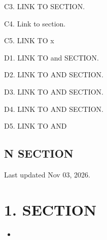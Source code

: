 \documentclass[letterpaper,10pt,english]{sphinxmanual}
\begin{document}
\sphinxAtStartPar
C\sphinxhyphen{}3. LINK TO {\hyperref[\detokenize{refs:translation-tips}]{}}\label{\detokenize{refs:x-tips}} SECTION.

\sphinxAtStartPar
C\sphinxhyphen{}4. Link to {\hyperref[\detokenize{refs:translation-tips}]{}} section.

\sphinxAtStartPar
C\sphinxhyphen{}5. LINK TO {\hyperref[\detokenize{refs:translation-tips}]{}}\label{\detokenize{refs:trans}} x {\hyperref[\detokenize{refs:translation-tips}]{}}\label{\detokenize{refs:lation}}

\sphinxAtStartPar
D\sphinxhyphen{}1. LINK TO {\hyperref[\detokenize{refs:translation-tips}]{}} and {\hyperref[\detokenize{refs:next-section}]{}} SECTION.

\sphinxAtStartPar
D\sphinxhyphen{}2. LINK TO {\hyperref[\detokenize{refs:translation-tips}]{}} AND {\hyperref[\detokenize{refs:next-section}]{}} SECTION.

\sphinxAtStartPar
D\sphinxhyphen{}3. LINK TO {\hyperref[\detokenize{refs:next-section}]{}} AND {\hyperref[\detokenize{refs:translation-tips}]{}} SECTION.

\sphinxAtStartPar
D\sphinxhyphen{}4. LINK TO {\hyperref[\detokenize{refs:next-section}]{}}\label{\detokenize{refs:n-section}} AND {\hyperref[\detokenize{refs:translation-tips}]{}}\label{\detokenize{refs:x-tips}} SECTION.

\sphinxAtStartPar
D\sphinxhyphen{}5. LINK TO {\hyperref[\detokenize{refs:next-section}]{}}\label{\detokenize{refs:next}} AND {\hyperref[\detokenize{refs:translation-tips}]{}}


\section{N SECTION}
\label{\detokenize{refs:next-section}}
\sphinxAtStartPar
Last updated Nov 03, 2026.

\sphinxstepscope


\chapter{1. SECTION}
\label{\detokenize{section:section}}\label{\detokenize{section::doc}}
\begin{sphinxcontents}
\begin{itemize}
\item {} 
\sphinxAtStartPar
{}\label{\detokenize{section:id1}}{\hyperref[\detokenize{section:sub-section}]{}}

\end{itemize}
\end{sphinxcontents}
\end{document}
